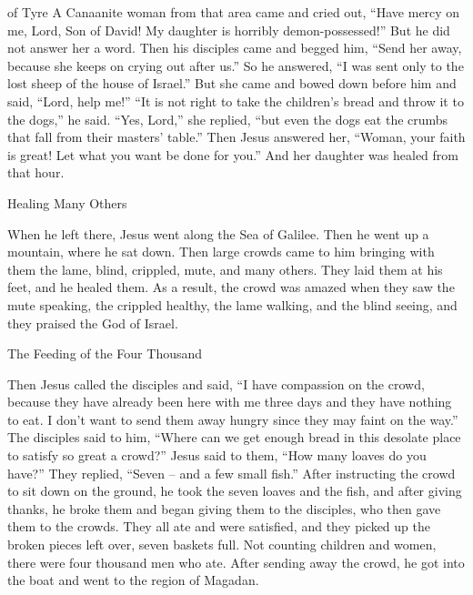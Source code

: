 {of Tyre
A Canaanite
woman
from
that
area
came
and cried out, “Have mercy
on me,
Lord,
Son
of David! My
daughter
is
horribly
demon-possessed!”
But
he did
not
answer
her
a word.
Then
his
disciples
came
and begged
him, “Send
her
away,
because
she keeps on crying out
after
us.”
So
he answered,
“I was sent
only
to
the lost
sheep
of
the house
of Israel.”
But
she came
and bowed down
before him
and said, “Lord,
help
me!”
“It is
not
right
to take
the children’s
bread
and
throw
it to the dogs,”
he said.
“Yes,
Lord,”
she replied, “but
even
the dogs
eat
the crumbs
that fall
from
their
masters’
table.”
Then
Jesus
answered
her,
“Woman,
your
faith
is great! Let what you want
be done
for you.”
And
her
daughter
was healed
from
that
hour.
\par }{\SH Healing Many Others
\par }{\PP {}When
he left
there,
Jesus
went
along
the Sea
of Galilee.
Then
he went up
a mountain,
where
he sat down.
Then
large
crowds
came
to him
bringing
with
them
the lame,
blind,
crippled,
mute,
and
many
others.
They laid
them
at
his
feet,
and
he healed
them.
As a result,
the crowd
was amazed
when
they saw
the mute
speaking,
the crippled healthy, the lame
walking,
and
the blind
seeing,
and
they praised
the God
of Israel.
\par }{\SH The Feeding of the Four Thousand
\par }{\PP {}Then
Jesus
called
the disciples
and said,
“I have compassion
on
the crowd,
because
they have
already
been here
with me
three
days
and
they have
nothing
to eat.
I
don’t
want
to send
them
away
hungry
since
they may faint
on
the way.”
The disciples
said
to him,
“Where
can we
get enough bread
in
this desolate place
to satisfy
so great
a crowd?”
Jesus
said
to them,
“How many
loaves
do you have?” They
replied,
“Seven
– and
a few
small fish.”
After instructing
the crowd
to sit down
on
the ground,
he took
the seven
loaves
and
the fish,
and
after giving thanks,
he broke
them and began giving
them to the disciples,
who
then gave them to the crowds.
They
all
ate
and
were satisfied,
and
they picked up
the broken pieces
left over,
seven
baskets
full.
Not counting
children
and
women,
there were
four thousand
men
who ate.
After sending away
the crowd,
he got
into
the boat
and
went
to
the region
of Magadan.

}
